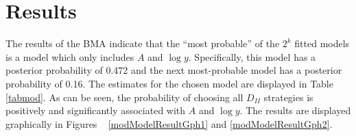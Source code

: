 \documentclass[1p, review]{elsarticle}\usepackage[]{graphicx}\usepackage[]{color}
\begin{document}
\section{Results}
\label{sec:results}

The results of the BMA indicate that the ``most probable'' of the $2^k$ fitted models is a model which only includes $A$ and $\log{y}$. Specifically, this model has a posterior probability of 0.472 and the next most-probable model has a posterior probability of 0.16. The estimates for the chosen model are displayed in Table ~ \ref{tabmod}. As can be seen, the probability of choosing all $D_{II}$ strategies is positively and significantly associated with $A$ and $\log{y}$. The results are displayed graphically in Figures ~ \ref{modModelResultGph1} and \ref{modModelResultGph2}. 

\begin{table}[ht]
\centering
{}
\caption{Model Results} 
\label{tabmod}
\end{table}
\end{document}
